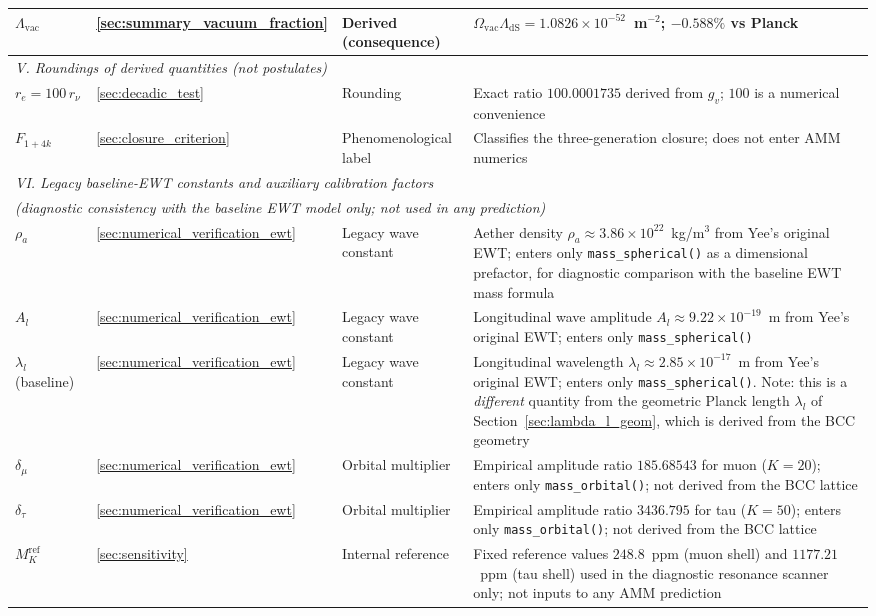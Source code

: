 \documentclass[10pt,a4paper]{article}
\begin{document}
{\begin{longtable}{@{}p{3.2cm}p{1.8cm}p{2.6cm}p{6.0cm}@{}}
		$\Lambda_{\text{vac}}$ & \ref{sec:summary_vacuum_fraction} & Derived (consequence) & $\Omega_{\text{vac}} \Lambda_{\text{dS}} = 1.0826 \times 10^{-52}$~m$^{-2}$; $-0.588\%$ vs Planck \\
		\midrule
		\multicolumn{4}{l}{\textit{V. Roundings of derived quantities (not postulates)}} \\
		\midrule
		$r_e = 100\,r_\nu$ & \ref{sec:decadic_test} & Rounding & Exact ratio $100.0001735$ derived from $g_v$; $100$ is a numerical convenience \\
		$F_{1+4k}$ & \ref{sec:closure_criterion} & Phenomenological label & Classifies the three-generation closure; does not enter AMM numerics \\
		\midrule
		\multicolumn{4}{l}{\textit{VI. Legacy baseline-EWT constants and auxiliary calibration factors}} \\
		\multicolumn{4}{l}{\textit{(diagnostic consistency with the baseline EWT model only; not used in any prediction)}} \\
		\midrule
		$\rho_a$ & \ref{sec:numerical_verification_ewt} & Legacy wave constant & Aether density $\rho_a \approx 3.86 \times 10^{22}$~kg/m$^3$ from Yee's original EWT; enters only \texttt{mass\_spherical()} as a dimensional prefactor, for diagnostic comparison with the baseline EWT mass formula \\
		$A_l$ & \ref{sec:numerical_verification_ewt} & Legacy wave constant & Longitudinal wave amplitude $A_l \approx 9.22 \times 10^{-19}$~m from Yee's original EWT; enters only \texttt{mass\_spherical()} \\
		$\lambda_l$ (baseline) & \ref{sec:numerical_verification_ewt} & Legacy wave constant & Longitudinal wavelength $\lambda_l \approx 2.85 \times 10^{-17}$~m from Yee's original EWT; enters only \texttt{mass\_spherical()}. Note: this is a \emph{different} quantity from the geometric Planck length $\lambda_l$ of Section~\ref{sec:lambda_l_geom}, which is derived from the BCC geometry \\
		$\delta_\mu$ & \ref{sec:numerical_verification_ewt} & Orbital multiplier & Empirical amplitude ratio $185.68543$ for muon ($K=20$); enters only \texttt{mass\_orbital()}; not derived from the BCC lattice \\
		$\delta_\tau$ & \ref{sec:numerical_verification_ewt} & Orbital multiplier & Empirical amplitude ratio $3436.795$ for tau ($K=50$); enters only \texttt{mass\_orbital()}; not derived from the BCC lattice \\
		$M_K^{\text{ref}}$ & \ref{sec:sensitivity} & Internal reference & Fixed reference values $248.8$~ppm (muon shell) and $1177.21$~ppm (tau shell) used in the diagnostic resonance scanner only; not inputs to any AMM prediction \\
		\bottomrule
	\end{longtable}
}
\end{document}
